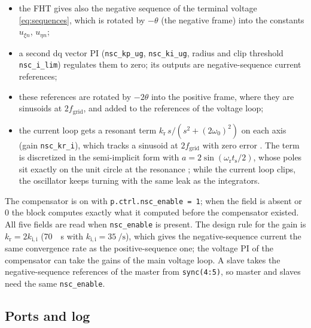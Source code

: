 \documentclass[11pt,a4paper]{scrartcl}
\newcommand{\ped}[1]{_{\mathrm{#1}}}
\newcommand{\code}[1]{\texttt{#1}}
\begin{document}
\begin{onehalfspace}
\begin{itemize}[nosep]
	\item the FHT gives also the negative sequence of the terminal voltage \eqref{eq:sequences}, which is rotated by $-\theta$ (the negative frame) into the constants $u_{\xi n}$, $u_{\eta n}$;
	\item a second dq vector PI (\code{nsc\_kp\_ug}, \code{nsc\_ki\_ug}, radius and clip threshold \code{nsc\_i\_lim}) regulates them to zero; its outputs are negative-sequence current references;
	\item these references are rotated by $-2\theta$ into the positive frame, where they are sinusoids at $2 f\ped{grid}$, and added to the references of the voltage loop;
	\item the current loop gets a resonant term $k\ped{r}\, s/(s^2 + (2\omega\ped{0})^2)$ on each axis (gain \code{nsc\_kr\_i}), which tracks a sinusoid at $2 f\ped{grid}$ with zero error \cite{liserre2006, teodorescu2006}. The term is discretized in the semi-implicit form with $a = 2\sin(\omega\ped{r} t\ped{s}/2)$, whose poles sit exactly on the unit circle at the resonance \cite{yepes2010}; while the current loop clips, the oscillator keeps turning with the same leak as the integrators.
\end{itemize}

\noindent The compensator is on with \code{p.ctrl.nsc\_enable = 1}; when the field is absent or 0 the block computes exactly what it computed before the compensator existed. All five fields are read when \code{nsc\_enable} is present. The design rule for the gain is $k\ped{r} = 2 k\ped{i,i}$ (\SI{70}{\per\second} with $k\ped{i,i} = \SI{35}{\per\second}$), which gives the negative-sequence current the same convergence rate as the positive-sequence one; the voltage PI of the compensator can take the gains of the main voltage loop. A slave takes the negative-sequence references of the master from \code{sync(4:5)}, so master and slaves need the same \code{nsc\_enable}.

\subsection{Ports and log}
\label{sec:gfm_ports}


\end{onehalfspace}
\end{document}
